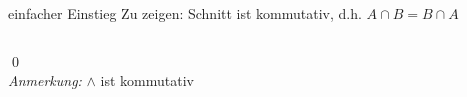 %
%
%
%

\begin{frame}{einfacher Einstieg}
        \onslide
            Zu zeigen: Schnitt ist kommutativ, d.h. $A \cap B = B \cap A$
        \begin{columns}
        \end{columns}
        \qed\\
    \small{\emph{Anmerkung:} $\wedge$ ist kommutativ}
\end{frame}

